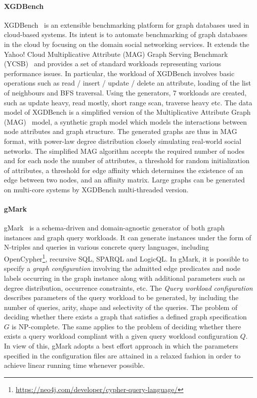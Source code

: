 \paragraph{XGDBench} XGDBench~\cite{Dayarathna:2014:GDB:2676904.2676939} is an extensible  benchmarking platform for graph databases used in cloud-based systems. Its intent is to automate
benchmarking of graph databases in the cloud by focusing on the domain social networking services. It extends the Yahoo! Cloud Multiplicative Attribute (MAG) Graph Serving Benchmark (YCSB)~\cite{Cooper:2010:BCS:1807128.1807152} and provides a set of standard workloads representing various performance issues. In particular, the workload of XGDBench involves basic operations such as read / insert / update / delete an attribute, loading of the list of neighbours and BFS traversal. Using the generators, 7 workloads are created, such as update heavy, read mostly, short range scan, traverse heavy etc.
The data model of XGDBench is a simplified version of the Multiplicative Attribute Graph (MAG)~\cite{Kim2010} model, a synthetic graph model which models the interactions between node attributes and  graph structure.
The generated graphs are thus in MAG format, with power-law degree distribution closely simulating real-world social networks.
The simplified MAG algorithm accepts the required number of nodes and for each node the number of attributes, a threshold for random  initialization of attributes, a threshold for edge affinity which determines the existence of an edge between two nodes, and an affinity matrix. \iffalse It has been proven that MAG generates graphs with both analytically tractable and statistically interesting properties.\fi
Large graphs can be generated on multi-core systems by XGDBench multi-threaded version.


\paragraph{gMark}  gMark~\cite{gMark} is a schema-driven and domain-agnostic generator of both graph instances and graph query workloads. It can generate instances under the form of N-triples and queries in various concrete query languages, including OpenCypher\footnote{\url{https://neo4j.com/developer/cypher-query-language/}}, recursive SQL, SPARQL and LogicQL. In gMark, it is possible to specify a \emph{graph configuration} involving the admitted edge predicates and node labels occurring in the graph instance along with additional parameters such as degree distribution, occurrence constraints, etc. The \emph{Query workload configuration} describes parameters of the query workload to be generated, by including the number of queries, arity, shape and selectivity of the queries.
The problem of deciding whether there exists a graph that satisfies a defined graph specification $G$ is NP-complete. The same applies to the problem of deciding
whether there exists a query workload compliant with a given query workload configuration $Q$. In view of this, gMark adopts a best effort approach in which the
parameters specified in the configuration files are attained in a relaxed fashion in order to achieve linear running time whenever possible.

